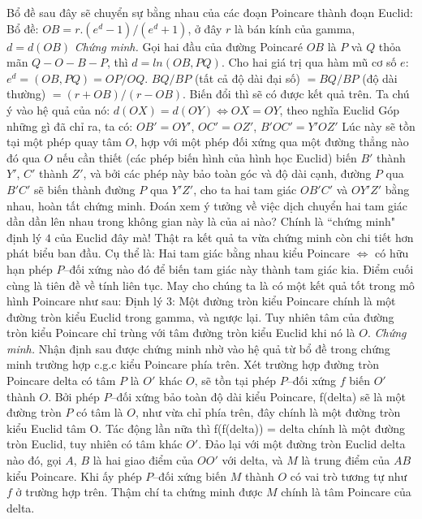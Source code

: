 \begin{multicols}{2}
	\vskip 0.1cm
	Bổ đề sau đây sẽ chuyển sự bằng nhau của các đoạn Poincare thành đoạn Euclid:
	\vskip 0.1cm
	Bổ đề: $OB = r.(e^d -1)/(e^d+1)$, ở đây $r$ là bán kính của gamma, $d = d(OB)$
	\vskip 0.1cm
	\textit{Chứng minh.} Gọi hai đầu của đường Poincaré $OB$ là $P$ và $Q$ thỏa mãn $Q - O - B - P$, thì $d = ln(OB, PQ)$.
	Cho hai giá trị qua hàm mũ cơ số $e$:
	$e^d = (OB, PQ) = OP/OQ$. $BQ/BP$ (tất cả độ dài đại số) $= BQ/BP$ (độ dài thường) $= (r + OB)/(r-OB)$.
	Biến đổi thì sẽ có được kết quả trên.
	Ta chú ý vào hệ quả của nó: $d(OX) = d(OY) \Leftrightarrow OX = OY$, theo nghĩa Euclid
	\vskip 0.1cm
	Góp những gì đã chỉ ra, ta có: $OB' = OY'$, $OC' = OZ'$, $B'OC' = Y'OZ'$
	\vskip 0.1cm
	Lúc này sẽ tồn tại một phép quay tâm $O$, hợp với một phép đối xứng qua một đường thẳng nào đó qua $O$ nếu cần thiết (các phép biến hình của hình học Euclid) biến $B'$ thành $Y'$, $C'$ thành $Z'$, và bởi các phép này bảo toàn góc và độ dài cạnh, đường $P$ qua $B'C'$ sẽ biến thành đường $P$ qua $Y'Z'$, cho ta hai tam giác $OB'C'$ và $OY'Z'$ bằng nhau, hoàn tất chứng minh.
	\vskip 0.1cm
	Đoán xem ý tưởng về việc dịch chuyển hai tam giác dần dần lên nhau trong không gian này là của ai nào? Chính là ``chứng minh" định lý $4$ của Euclid đây mà!
	Thật ra kết quả ta vừa chứng minh còn chi tiết hơn phát biểu ban đầu. Cụ thể là:
	\vskip 0.1cm
	Hai tam giác bằng nhau kiểu Poincare $\Leftrightarrow$ có hữu hạn phép $P$--đối xứng nào đó để biến tam giác này thành tam giác kia.
	\vskip 0.1cm
	Điểm cuối cùng là tiên đề về tính liên tục. May cho chúng ta là có một kết quả tốt trong mô hình Poincare như sau:
	\vskip 0.1cm
	Định lý $3$: Một đường tròn kiểu Poincare chính là một đường tròn kiểu Euclid trong gamma, và ngược lại. Tuy nhiên tâm của đường tròn kiểu Poincare chỉ trùng với tâm đường tròn kiểu Euclid khi nó là $O$.
	\vskip 0.1cm
	\textit{Chứng minh.} Nhận định sau được chứng minh nhờ vào hệ quả từ bổ đề trong chứng minh trường hợp c.g.c kiểu Poincare phía trên. 
	Xét trường hợp đường tròn Poincare delta có tâm $P$ là $O'$ khác $O$, sẽ tồn tại phép $P$--đối xứng $f$ biến $O'$ thành $O$. Bởi phép $P$--đối xứng bảo toàn độ dài kiểu Poincare, f(delta) sẽ là một đường tròn $P$ có tâm là $O$, như vừa chỉ phía trên, đây chính là một đường tròn kiểu Euclid tâm O. Tác động lần nữa thì f(f(delta)) = delta chính là một đường tròn Euclid, tuy nhiên có tâm khác $O'$.
	\vskip 0.1cm
	Đảo lại với một đường tròn Euclid delta nào đó, gọi $A$, $B$ là hai giao điểm của $OO'$ với delta, và $M$ là trung điểm của $AB$ kiểu Poincare. Khi ấy phép $P$--đối xứng biến $M$ thành $O$ có vai trò tương tự như $f$ ở trường hợp trên. Thậm chí ta chứng minh được $M$ chính là tâm Poincare của delta.

\end{multicols}
